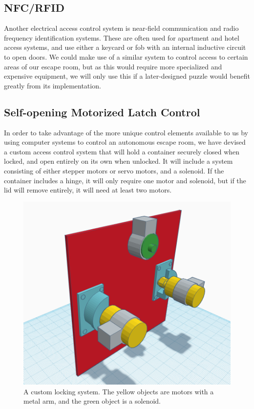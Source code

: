 \documentclass[conference]{IEEEtran}
\begin{document}
\subsection{NFC/RFID}
Another electrical access control system is near-field communication and radio frequency identification
systems. These are often used for apartment and hotel access systems, and use either a keycard or
fob with an internal inductive circuit to open doors. We could make use of a similar system to control
access to certain areas of our escape room, but as this would require more specialized and expensive
equipment, we will only use this if a later-designed puzzle would benefit greatly from its implementation.

\subsection{Self-opening Motorized Latch Control}
In order to take advantage of the more unique control elements available to us by using computer
systems to control an autonomous escape room, we have devised a custom access control system that
will hold a container securely closed when locked, and open entirely on its own when unlocked. It
will include a system consisting of either stepper motors or servo motors, and a solenoid. If the container
includes a hinge, it will only require one motor and solenoid, but if the lid will remove entirely,
it will need at least two motors.
\\

\begin{figure}[H]
    \centering
    \includegraphics[width=0.85\columnwidth]{Images/LockMech.png}
    \caption{A custom locking system. The yellow objects are motors with a metal arm, and the green object is a solenoid.}
\end{figure}
\end{document}
